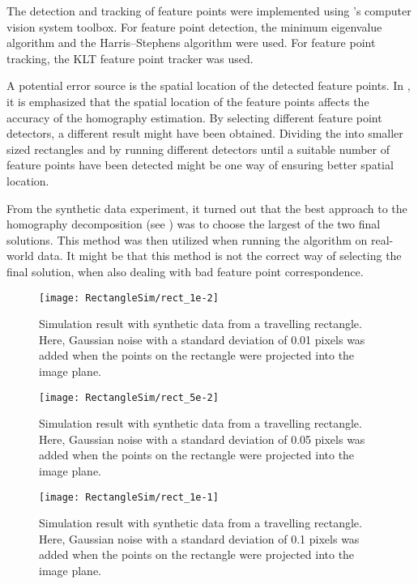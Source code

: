 The detection and tracking of feature points were implemented using \matlab's computer vision system toolbox.
For feature point detection, the minimum eigenvalue algorithm \cite{mineigendetector:2018} and the Harris–Stephens algorithm \cite{harrisdetector:2018} were used.
For feature point tracking, the KLT feature point tracker \cite{pointtracker:2018} was used.

A potential error source is the spatial location of the detected feature points.
In \cite{Bostanci:2012}, it is emphasized that the spatial location of the feature points affects the accuracy of the homography estimation.
By selecting different feature point detectors, a different result might have been obtained.
Dividing the \abbrROI into smaller sized rectangles and by running different detectors until a suitable number of feature points have been detected might be one way of ensuring better spatial location.

From the synthetic data experiment, it turned out that the best approach to the homography decomposition (see ) was to choose the largest of the two final solutions.
This method was then utilized when running the algorithm on real-world data.
It might be that this method is not the correct way of selecting the final solution, when also dealing with bad feature point correspondence.

\clearpage

\begin{figure}[!ht]
	\centering
	\texttt{[image: RectangleSim/rect\_1e-2]}
	\caption{\label{fig:rectsim1e-2} Simulation result with synthetic data from a travelling rectangle. Here, Gaussian noise with a standard deviation of 0.01 pixels was added when the points on the rectangle were projected into the image plane.}
\end{figure}

\begin{figure}[!ht]
	\centering
	\texttt{[image: RectangleSim/rect\_5e-2]}
	\caption{\label{fig:rectsim5e-2} Simulation result with synthetic data from a travelling rectangle. Here, Gaussian noise with a standard deviation of 0.05 pixels was added when the points on the rectangle were projected into the image plane.}
\end{figure}

\begin{figure}[!ht]
	\centering
	\texttt{[image: RectangleSim/rect\_1e-1]}
	\caption{\label{fig:rectsim1e-1} Simulation result with synthetic data from a travelling rectangle. Here, Gaussian noise with a standard deviation of 0.1 pixels was added when the points on the rectangle were projected into the image plane.}
\end{figure}

